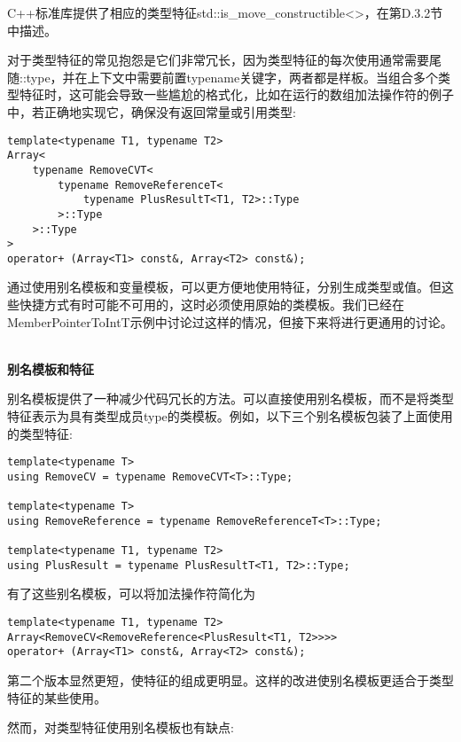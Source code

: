 C++标准库提供了相应的类型特征std::is\_move\_constructible<>，在第D.3.2节中描述。


对于类型特征的常见抱怨是它们非常冗长，因为类型特征的每次使用通常需要尾随::type，并在上下文中需要前置typename关键字，两者都是样板。当组合多个类型特征时，这可能会导致一些尴尬的格式化，比如在运行的数组加法操作符的例子中，若正确地实现它，确保没有返回常量或引用类型:

\begin{lstlisting}[style=styleCXX]
template<typename T1, typename T2>
Array<
	typename RemoveCVT<
		typename RemoveReferenceT<
			typename PlusResultT<T1, T2>::Type
		>::Type
	>::Type
>
operator+ (Array<T1> const&, Array<T2> const&);
\end{lstlisting}

通过使用别名模板和变量模板，可以更方便地使用特征，分别生成类型或值。但这些快捷方式有时可能不可用的，这时必须使用原始的类模板。我们已经在MemberPointerToIntT示例中讨论过这样的情况，但接下来将进行更通用的讨论。

\hspace*{\fill} \\ %
\noindent
\textbf{别名模板和特征}

别名模板提供了一种减少代码冗长的方法。可以直接使用别名模板，而不是将类型特征表示为具有类型成员type的类模板。例如，以下三个别名模板包装了上面使用的类型特征:

\begin{lstlisting}[style=styleCXX]
template<typename T>
using RemoveCV = typename RemoveCVT<T>::Type;

template<typename T>
using RemoveReference = typename RemoveReferenceT<T>::Type;

template<typename T1, typename T2>
using PlusResult = typename PlusResultT<T1, T2>::Type;
\end{lstlisting}

有了这些别名模板，可以将加法操作符简化为

\begin{lstlisting}[style=styleCXX]
template<typename T1, typename T2>
Array<RemoveCV<RemoveReference<PlusResult<T1, T2>>>>
operator+ (Array<T1> const&, Array<T2> const&);
\end{lstlisting}

第二个版本显然更短，使特征的组成更明显。这样的改进使别名模板更适合于类型特征的某些使用。

然而，对类型特征使用别名模板也有缺点:

